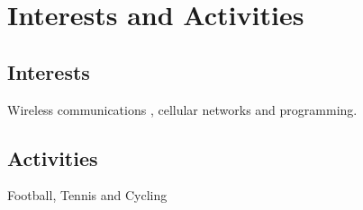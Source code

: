 \documentclass[a4paper,10pt]{article}
\begin{document}
\section{Interests and Activities}
\subsection*{Interests}
Wireless communications , cellular networks and programming.\\
\subsection*{Activities}
Football, Tennis and Cycling



\end{document}
